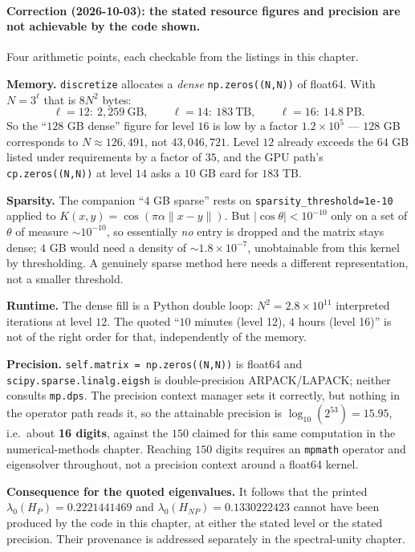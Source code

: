 \paragraph{Correction (2026-10-03): the stated resource figures and precision are
not achievable by the code shown.}
Four arithmetic points, each checkable from the listings in this chapter.

\textbf{Memory.} \texttt{discretize} allocates a \emph{dense}
\texttt{np.zeros((N,N))} of float64. With $N = 3^{\ell}$ that is $8N^2$ bytes:
\[
\ell = 12:\ 2{,}259\ \mathrm{GB}, \qquad
\ell = 14:\ 183\ \mathrm{TB}, \qquad
\ell = 16:\ 14.8\ \mathrm{PB}.
\]
So the ``$128$ GB dense'' figure for level $16$ is low by a factor
$1.2\times10^{5}$ --- $128$ GB corresponds to $N \approx 126{,}491$, not
$43{,}046{,}721$. Level $12$ already exceeds the $64$ GB listed under
requirements by a factor of $35$, and the GPU path's
\texttt{cp.zeros((N,N))} at level $14$ asks a $10$ GB card for $183$ TB.

\textbf{Sparsity.} The companion ``$4$ GB sparse'' rests on
\texttt{sparsity\_threshold=1e-10} applied to
$K(x,y) = \cos(\pi\alpha\|x-y\|)$. But $|\cos\theta| < 10^{-10}$ only on a set of
$\theta$ of measure $\sim10^{-10}$, so essentially \emph{no} entry is dropped and
the matrix stays dense; $4$ GB would need a density of $\sim1.8\times10^{-7}$,
unobtainable from this kernel by thresholding. A genuinely sparse method here
needs a different representation, not a smaller threshold.

\textbf{Runtime.} The dense fill is a Python double loop: $N^2 = 2.8\times10^{11}$
interpreted iterations at level $12$. The quoted ``$10$ minutes (level 12),
$4$ hours (level 16)'' is not of the right order for that, independently of the
memory.

\textbf{Precision.} \texttt{self.matrix = np.zeros((N,N))} is float64 and
\texttt{scipy.sparse.linalg.eigsh} is double-precision ARPACK/LAPACK; neither
consults \texttt{mp.dps}. The precision context manager sets it correctly, but
nothing in the operator path reads it, so the attainable precision is
$\log_{10}(2^{53}) = 15.95$, i.e.\ about \textbf{16 digits}, against the $150$
claimed for this same computation in the numerical-methods chapter. Reaching
$150$ digits requires an \texttt{mpmath} operator and eigensolver throughout, not
a precision context around a float64 kernel.

\textbf{Consequence for the quoted eigenvalues.} It follows that the printed
$\lambda_0(H_P) = 0.2221441469$ and $\lambda_0(H_{NP}) = 0.1330222423$ cannot
have been produced by the code in this chapter, at either the stated level or the
stated precision. Their provenance is addressed separately in the spectral-unity
chapter.

